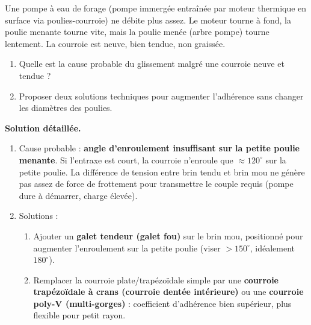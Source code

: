 \documentclass[11pt]{article}
\begin{document}
\begin{exoresolu}
Une pompe à eau de forage (pompe immergée entraînée par moteur thermique en surface via poulies-courroie) ne débite plus assez. Le moteur tourne à fond, la poulie menante tourne vite, mais la poulie menée (arbre pompe) tourne lentement. La courroie est neuve, bien tendue, non graissée.
\begin{enumerate}
\item Quelle est la cause probable du glissement malgré une courroie neuve et tendue ?
\item Proposer deux solutions techniques pour augmenter l'adhérence sans changer les diamètres des poulies.
\end{enumerate}
\tcblower
\textbf{Solution détaillée.}
\begin{enumerate}
\item Cause probable : \textbf{angle d'enroulement insuffisant sur la petite poulie menante}. Si l'entraxe est court, la courroie n'enroule que $\approx 120^\circ$ sur la petite poulie. La différence de tension entre brin tendu et brin mou ne génère pas assez de force de frottement pour transmettre le couple requis (pompe dure à démarrer, charge élevée).
\item Solutions :
      \begin{enumerate}
      \item Ajouter un \textbf{galet tendeur (galet fou)} sur le brin mou, positionné pour augmenter l'enroulement sur la petite poulie (viser $> 150^\circ$, idéalement $180^\circ$).
      \item Remplacer la courroie plate/trapézoïdale simple par une \textbf{courroie trapézoïdale à crans (courroie dentée intérieure)} ou une \textbf{courroie poly-V (multi-gorges)} : coefficient d'adhérence bien supérieur, plus flexible pour petit rayon.
      \end{enumerate}
\end{enumerate}
\end{exoresolu}
\end{document}
